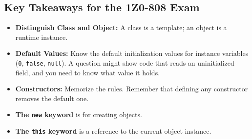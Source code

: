 \documentclass[12pt]{article}
\begin{document}
\begin{enumerate}[label=(\arabic*)]
\section{Key Takeaways for the 1Z0-808 Exam}
\begin{itemize}
    \item \textbf{Distinguish Class and Object:} A class is a template; an object is a runtime instance.
    \item \textbf{Default Values:} Know the default initialization values for instance variables (\texttt{0}, \texttt{false}, \texttt{null}). A question might show code that reads an uninitialized field, and you need to know what value it holds.
    \item \textbf{Constructors:} Memorize the rules. Remember that defining any constructor removes the default one.
    \item \textbf{The \texttt{new} keyword} is for creating objects.
    \item \textbf{The \texttt{this} keyword} is a reference to the current object instance.
\end{itemize}
\end{enumerate}
\end{document}
